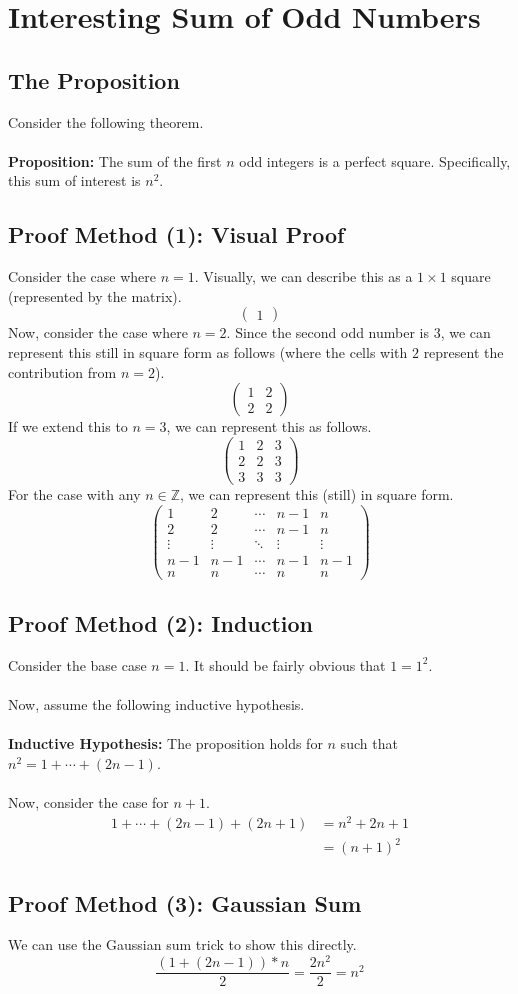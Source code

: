 \section{Interesting Sum of Odd Numbers}
\subsection{The Proposition}
Consider the following theorem.\\
\\
\textbf{Proposition:} The sum of the first $n$ odd integers is a perfect square. Specifically, this sum of interest is $n^2$. 

\subsection{Proof Method (1): Visual Proof}
Consider the case where $n = 1$. Visually, we can describe this as a $1 \times 1$ square (represented by the matrix).
$$
\begin{pmatrix}
    1
\end{pmatrix}
$$
Now, consider the case where $n = 2$. Since the second odd number is $3$, we can represent this still in square form as follows (where the cells with $2$ represent the contribution from $n =2$).
$$
\begin{pmatrix}
    1 & 2 \\
    2 & 2
\end{pmatrix}
$$
If we extend this to $n = 3$, we can represent this as follows.
$$
\begin{pmatrix}
    1 & 2 & 3 \\
    2 & 2 & 3 \\
    3 & 3 & 3 
\end{pmatrix}
$$
For the case with any $n \in \mathbb{Z}$, we can represent this (still) in square form.
$$
\begin{pmatrix}
    1 & 2 & \cdots & n-1 & n \\
    2 & 2 & \cdots & n-1 & n \\
    \vdots & \vdots & \ddots & \vdots & \vdots \\
    n-1 & n-1 & \cdots & n-1  & n-1 \\
    n & n & \cdots & n & n
\end{pmatrix}
$$
\subsection{Proof Method (2): Induction}
Consider the base case $n=1$. It should be fairly obvious that $1 = 1^2$.\\
\\
Now, assume the following inductive hypothesis.\\
\\
\textbf{Inductive Hypothesis:} The proposition holds for $n$ such that $n^2 = 1 + \cdots + (2n-1)$.\\
\\
Now, consider the case for $n +1$. 
\begin{align*}
1 + \cdots + (2n -1) + (2n + 1) &= n^2 + 2n + 1 \\
&= (n+1)^2 
\end{align*}
\subsection{Proof Method (3): Gaussian Sum}
We can use the Gaussian sum trick to show this directly.
$$
\frac{\left(1 + (2n-1)\right) * n}{2} = \frac{2n^2}{2} = n^2
$$